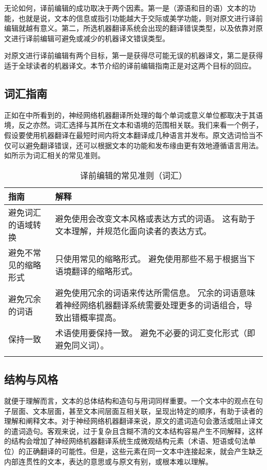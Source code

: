 \documentclass[output=paper,colorlinks,citecolor=brown]{langscibook}
\begin{document}
无论如何，译前编辑的成功取决于两个因素。第一是（源语和目的语）文本的功能，也就是说，文本的信息或指引功能越大于交际或美学功能，则对原文进行译前编辑就越有意义。第二，所选机器翻译系统会出现的翻译错误类型，以及依靠对原文进行译前编辑可避免或减少的机器译文错误类型。

对原文进行译前编辑有两个目标，第一是获得尽可能无误的机器译文，第二是获得适于全球读者的机器译文。本节介绍的译前编辑指南正是对这两个目标的回应。


\subsection{词汇指南}

正如在中所看到的，神经网络机器翻译所处理的每个单词或意义单位都取决于其语境，反之亦然。词汇选择与其所在文本和语境的范围相关联。我们来看一个例子，假设要使用机器翻译在最短时间内将文本翻译成几种语言并发布。原文选词恰当不仅可以避免翻译错误，还可以根据文本的功能和发布缘由更有效地遵循语言用法。如所示为词汇相关的常见准则。

\begin{table}
\begin{tabularx}{\textwidth}{lQ}
\lsptoprule
{指南} & {解释}\\
\midrule
避免词汇的语域转换 & 避免使用会改变文本风格或表达方式的词语。
这有助于文本理解，并规范化面向读者的表达方式。\\
\tablevspace
避免不常见的缩略形式 & 只使用常见的缩略形式。
避免使用那些不易于根据当下语境翻译的缩略形式。 \\
\tablevspace
避免冗余的词语 & 避免使用冗余的词语来传达所需信息。
冗余的词语意味着神经网络机器翻译系统需要处理更多的词语组合，导致出错概率提高。 \\
\tablevspace
保持一致 & 术语使用要保持一致。
避免不必要的词汇变化形式（即避免同义词）。\\
\lspbottomrule
\end{tabularx}
\caption{译前编辑的常见准则（词汇）}
\label{tab:sanchez:1}
\end{table}

\subsection{结构与风格}\largerpage

就便于理解而言，文本的总体结构和造句与用词同样重要。一个文本中的观点在句子层面、文本层面，甚至文本间层面互相关联，呈现出特定的顺序，有助于读者的理解和阐释文本。对于神经网络机器翻译来说，原文的遣词造句会激活或阻止译文的遣词造句。客观来说，过于复杂且含糊不清的文本结构容易产生不同解释，这样的结构会增加了神经网络机器翻译系统生成微观结构元素（术语、短语或句法单位）的正确翻译的可能性。但是，这些元素在同一文本中连接起来，就会产生缺乏内部连贯性的文本，表达的意思或与原文有别，或根本难以理解。
\end{document}

